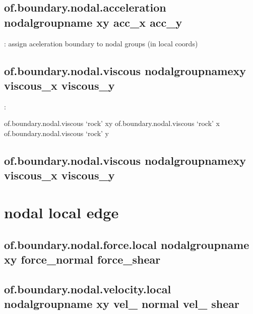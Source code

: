 \documentclass[letterpaper,10pt,english]{sphinxmanual}
\begin{document}
\subsection{of.boundary.nodal.acceleration nodalgroupname xy acc\_x acc\_y}
\label{\detokenize{rst_tutorials/command_line_guide:of-boundary-nodal-acceleration-nodalgroupname-xy-acc-x-acc-y}}
: assign aceleration boundary to nodal groups (in local coords)


\subsection{of.boundary.nodal.viscous nodalgroupnamexy viscous\_x viscous\_y}
\label{\detokenize{rst_tutorials/command_line_guide:of-boundary-nodal-viscous-nodalgroupnamexy-viscous-x-viscous-y}}
:

\begin{sphinxVerbatim}[commandchars=\\\{\}]
of.boundary.nodal.viscous ‘rock’ xy
of.boundary.nodal.viscous ‘rock’ x
of.boundary.nodal.viscous ‘rock’ y
\end{sphinxVerbatim}


\subsection{of.boundary.nodal.viscous nodalgroupnamexy viscous\_x viscous\_y}
\label{\detokenize{rst_tutorials/command_line_guide:of-boundary-nodal-viscous-nodalgroupnamexy-viscous-x-viscous-y-1}}\label{\detokenize{rst_tutorials/command_line_guide:id3}}

\section{nodal local edge}
\label{\detokenize{rst_tutorials/command_line_guide:nodal-local-edge}}

\subsection{of.boundary.nodal.force.local nodalgroupname xy force\_normal force\_shear}
\label{\detokenize{rst_tutorials/command_line_guide:of-boundary-nodal-force-local-nodalgroupname-xy-force-normal-force-shear}}

\subsection{of.boundary.nodal.velocity.local nodalgroupname xy vel\_ normal vel\_ shear}
\label{\detokenize{rst_tutorials/command_line_guide:of-boundary-nodal-velocity-local-nodalgroupname-xy-vel-normal-vel-shear}}
\end{document}
